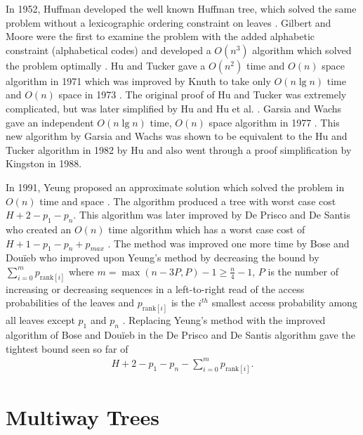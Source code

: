 \documentclass[letterpaper,12pt,titlepage,oneside,final]{book}
\theoremstyle{plain}
\begin{document}
In 1952, Huffman developed the well known Huffman tree, which solved the same problem without a lexicographic ordering constraint on leaves \cite{huffman1952method}. Gilbert and Moore were the first to examine the problem with the added alphabetic constraint (alphabetical codes) and developed a $O(n^3)$ algorithm which solved the problem optimally \cite{gilbert1959variable}. Hu and Tucker gave a $O(n^2)$ time and $O(n)$ space algorithm in 1971 \cite{hu1971optimal} which was improved by Knuth to take only $O(n \lg n)$ time and $O(n)$ space in 1973 \cite{knuth1973sorting}. The original proof of Hu and Tucker was extremely complicated, but was later simplified by Hu \cite{hu1973new} and Hu et al. \cite{hu1979binary}. Garsia and Wachs gave an independent $O(n \lg n)$ time, $O(n)$ space algorithm in 1977 \cite{garsia1977new}. This new algorithm by Garsia and Wachs was shown to be equivalent to the Hu and Tucker algorithm in 1982 by Hu \cite{Hu1982Book} and also went through a proof simplification \cite{kingston1988new} by Kingston in 1988.

In 1991, Yeung proposed an approximate solution which solved the problem in $O(n)$ time and space \cite{yeung1991alphabetic}. The algorithm produced a tree with worst case cost $H + 2 - p_1-p_n$. This algorithm was later improved by De Prisco and De Santis who created an $O(n)$ time algorithm which has a worst case cost of $H+1-p_1-p_n+p_{max}$ \cite{de1993binary}. The method was improved one more time by Bose and Dou\"{i}eb who improved upon Yeung's method by decreasing the bound by $\sum_{i=0}^m p_{\text{rank}[i]}$ where $m=\max({n-3P,P})-1 \geq \frac{n}{4} - 1$, $P$ is the number of increasing or decreasing sequences in a left-to-right read of the access probabilities of the leaves and $p_{\text{rank}[i]}$ is the $i^{th}$ smallest access probability among all leaves except $p_1$ and $p_n$ \cite{bose2009efficient}. Replacing Yeung's method with the improved algorithm of Bose and Dou\"{i}eb in the De Prisco and De Santis algorithm gave the tightest bound seen so far of 
\begin{align*}
H+2-p_1-p_n-\sum_{i=0}^m p_{\text{rank}[i]}. 
\end{align*}

\section{Multiway Trees} \label{sec:MWT}
\end{document}
